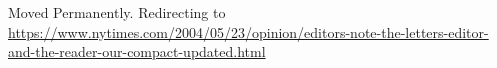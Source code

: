 Moved Permanently. Redirecting to
\href{https://www.nytimes.com/2004/05/23/opinion/editors-note-the-letters-editor-and-the-reader-our-compact-updated.html}{https://www.nytimes.com/2004/05/23/opinion/editors-note-the-letters-editor-and-the-reader-our-compact-updated.html}
